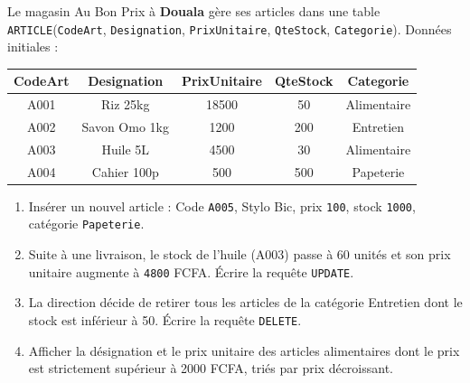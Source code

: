 \documentclass[11pt]{article}
\begin{document}
\begin{exercice}
Le magasin \og{}Au Bon Prix\fg{} à \textbf{Douala} gère ses articles dans une table \texttt{ARTICLE}(\texttt{CodeArt}, \texttt{Designation}, \texttt{PrixUnitaire}, \texttt{QteStock}, \texttt{Categorie}). Données initiales :
\begin{center}
\begin{tabular}{ccccc}
\toprule
CodeArt & Designation & PrixUnitaire & QteStock & Categorie \\
\midrule
A001 & Riz 25kg & 18500 & 50 & Alimentaire \\
A002 & Savon Omo 1kg & 1200 & 200 & Entretien \\
A003 & Huile 5L & 4500 & 30 & Alimentaire \\
A004 & Cahier 100p & 500 & 500 & Papeterie \\
\bottomrule
\end{tabular}
\end{center}
\begin{enumerate}
    \item Insérer un nouvel article : Code \texttt{A005}, \og{}Stylo Bic\fg{}, prix \texttt{100}, stock \texttt{1000}, catégorie \texttt{Papeterie}.
    \item Suite à une livraison, le stock de l'huile (A003) passe à 60 unités et son prix unitaire augmente à \texttt{4800} FCFA. Écrire la requête \texttt{UPDATE}.
    \item La direction décide de retirer tous les articles de la catégorie \og{}Entretien\fg{} dont le stock est inférieur à 50. Écrire la requête \texttt{DELETE}.
    \item Afficher la désignation et le prix unitaire des articles alimentaires dont le prix est strictement supérieur à 2000 FCFA, triés par prix décroissant.
\end{enumerate}
\end{exercice}
\end{document}
